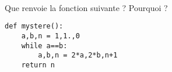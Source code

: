 \exer{[NBR-001]}
\setcounter{numques}{0}~\\

\question{} Que renvoie la fonction suivante ? Pourquoi ? 
\begin{lstlisting}
def mystere():
    a,b,n = 1,1.,0
    while a==b:
        a,b,n = 2*a,2*b,n+1
    return n
\end{lstlisting}
